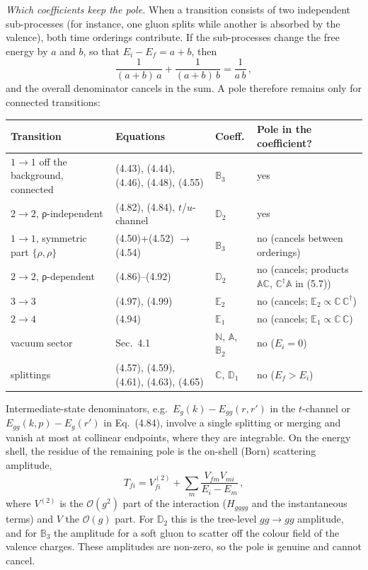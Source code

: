 \documentclass[11pt,a4paper]{article}
\begin{document}
\emph{Which coefficients keep the pole.} When a transition consists of two independent sub-processes (for instance, one gluon splits while another is absorbed by the valence), both time orderings contribute. If the sub-processes change the free energy by $a$ and $b$, so that $E_i-E_f=a+b$, then
\[
\frac{1}{(a+b)\,a}+\frac{1}{(a+b)\,b}=\frac{1}{a\,b}\,,
\]
and the overall denominator cancels in the sum. A pole therefore remains only for connected transitions:
\begin{center}
\small
\renewcommand{\arraystretch}{1.25}
\begin{tabular}{p{3.6cm}p{4.3cm}p{1.6cm}p{4.2cm}}
\toprule
\textbf{Transition} & \textbf{Equations} & \textbf{Coeff.} & \textbf{Pole in the coefficient?}\\
\midrule
$1\to1$ off the background, connected & (4.43), (4.44), (4.46), (4.48), (4.55) & $\mathbb B_3$ & yes\\
$2\to2$, ρ-independent & (4.82), (4.84), $t$/$u$-channel & $\mathbb D_2$ & yes\\
\midrule
$1\to1$, symmetric part $\{\rho,\rho\}$ & (4.50)+(4.52) $\to$ (4.54) & $\mathbb B_3$ & no (cancels between orderings)\\
$2\to2$, ρ-dependent & (4.86)--(4.92) & $\mathbb D_2$ & no (cancels; products $\mathbb A\mathbb C$, $\mathbb C^\dagger\mathbb A$ in (5.7))\\
$3\to3$ & (4.97), (4.99) & $\mathbb E_2$ & no (cancels; $\mathbb E_2\propto\mathbb C\,\mathbb C^\dagger$)\\
$2\to4$ & (4.94) & $\mathbb E_1$ & no (cancels; $\mathbb E_1\propto\mathbb C\,\mathbb C$)\\
vacuum sector & Sec.~4.1 & $\mathbb N$, $\mathbb A$, $\mathbb B_2$ & no ($E_i=0$)\\
splittings & (4.57), (4.59), (4.61), (4.63), (4.65) & $\mathbb C$, $\mathbb D_1$ & no ($E_f>E_i$)\\
\bottomrule
\end{tabular}
\end{center}
Intermediate-state denominators, e.g.\ $E_g(k)-E_{gg}(r,r')$ in the $t$-channel or $E_{gg}(k,p)-E_g(r')$ in Eq.~(4.84), involve a single splitting or merging and vanish at most at collinear endpoints, where they are integrable. On the energy shell, the residue of the remaining pole is the on-shell (Born) scattering amplitude,
\[
T_{fi}=V^{(2)}_{fi}+\sum_m\frac{V_{fm}V_{mi}}{E_i-E_m}\,,
\]
where $V^{(2)}$ is the $\mathcal O(g^2)$ part of the interaction ($H_{gggg}$ and the instantaneous terms) and $V$ the $\mathcal O(g)$ part. For $\mathbb D_2$ this is the tree-level $gg\to gg$ amplitude, and for $\mathbb B_3$ the amplitude for a soft gluon to scatter off the colour field of the valence charges. These amplitudes are non-zero, so the pole is genuine and cannot cancel.
\end{document}
